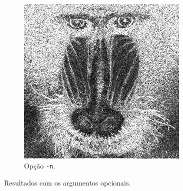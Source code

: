 \begin{figure}[H]
\begin{subfigure}{0.48\textwidth}
            \includegraphics[width=0.9\textwidth]{resultados/baboon_h1n.png}
            \caption{Opção \texttt{-n}.}
            \label{fig:opt:n}
        \end{subfigure}

        \caption{Resultados com os argumentos opcionais.}
        \label{fig:opt}
    \end{figure}

